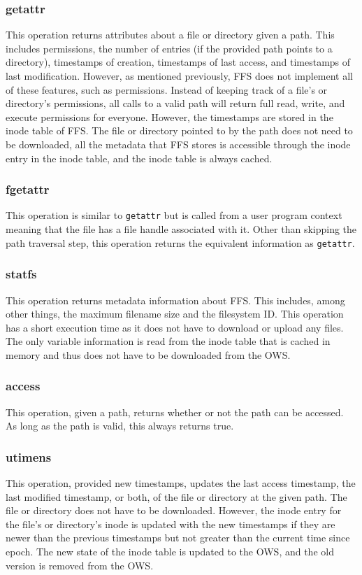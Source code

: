 \subsubsection{getattr}
This operation returns attributes about a file or directory given a path. This includes permissions, the number of entries (if the provided path points to a directory), timestamps of creation, timestamps of last access, and timestamps of last modification. However, as mentioned previously, \gls{FFS} does not implement all of these features, such as permissions. Instead of keeping track of a file's or directory's permissions, all calls to a valid path will return full read, write, and execute permissions for everyone. However, the timestamps are stored in the inode table of \gls{FFS}. The file or directory pointed to by the path does not need to be downloaded, all the metadata that \gls{FFS} stores is accessible through the inode entry in the inode table, and the inode table is always cached.

\subsubsection{fgetattr}
This operation is similar to \texttt{getattr} but is called from a user program context meaning that the file has a file handle associated with it. Other than skipping the path traversal step, this operation returns the equivalent information as \texttt{getattr}.

\subsubsection{statfs}
This operation returns metadata information about \gls{FFS}. This includes, among other things, the maximum filename size and the filesystem ID. This operation has a short execution time as it does not have to download or upload any files. The only variable information is read from the inode table that is cached in memory and thus does not have to be downloaded from the \gls{OWS}.

\subsubsection{access}
This operation, given a path, returns whether or not the path can be accessed. As long as the path is valid, this always returns true.

\subsubsection{utimens}
This operation, provided new timestamps, updates the last access timestamp, the last modified timestamp, or both, of the file or directory at the given path. The file or directory does not have to be downloaded. However, the inode entry for the file's or directory's inode is updated with the new timestamps if they are newer than the previous timestamps but not greater than the current time since epoch. The new state of the inode table is updated to the \gls{OWS}, and the old version is removed from the \gls{OWS}.

